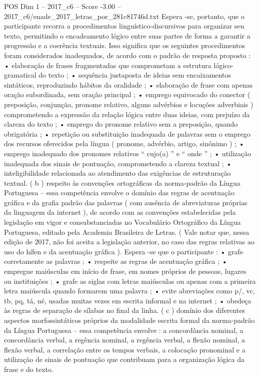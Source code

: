 \begin{textsample}{POS Dim 1 – 2017\_c6 – Score -3.00 – 2017\_c6/enade\_2017\_letras\_por\_281c81746d.txt}
Espera -se, portanto, que o participante recorra a procedimentos linguístico-discursivos para organizar seu texto, permitindo o encadeamento lógico entre suas partes de forma a garantir a progressão e a coerência textuais.
Isso significa que os seguintes procedimentos foram considerados inadequados, de acordo com o padrão de resposta proposto : • elaboração de frases fragmentadas que comprometam a estrutura lógico-gramatical do texto ; • sequência justaposta de ideias sem encaixamentos sintáticos, reproduzindo hábitos da oralidade ; • elaboração de frase com apenas oração subordinada, sem oração principal ; • emprego equivocado do conector ( preposição, conjunção, pronome relativo, alguns advérbios e locuções adverbiais ) comprometendo a expressão da relação lógica entre duas ideias, com prejuízo da clareza do texto ; • emprego do pronome relativo sem a preposição, quando obrigatória ; • repetição ou substituição inadequada de palavras sem o emprego dos recursos oferecidos pela língua ( pronome, advérbio, artigo, sinônimo ) ; • emprego inadequado dos pronomes relativos “ cujo(a) ” e “ onde ” ; • utilização inadequada dos sinais de pontuação, comprometendo a clareza textual ; • inteligibilidade relacionada ao atendimento das exigências de estruturação textual. ( b ) respeito às convenções ortográficas da norma-padrão da Língua Portuguesa – essa competência envolve o domínio das regras de acentuação gráfica e da grafia padrão das palavras ( com ausência de abreviaturas próprias da linguagem da internet ), de acordo com as convenções estabelecidas pela legislação em vigor e consubstanciadas no Vocabulário Ortográfico da Língua Portuguesa, editado pela Academia Brasileira de Letras. ( Vale notar que, nessa edição de 2017, não foi aceita a legislação anterior, no caso das regras relativas ao uso do hífen e da acentuação gráfica ).
Espera -se que o participante : • grafe corretamente as palavras ; • respeite as regras de acentuação gráfica ; • empregue maiúsculas em início de frase, em nomes próprios de pessoas, lugares ou instituições ; • grafe as siglas com letras maiúsculas ou apenas com a primeira letra maiúscula quando formarem uma palavra ; • evite abreviações como p/, vc, tb, pq, tá, né, usadas muitas vezes em escrita informal e na internet ; • obedeça às regras de separação de sílabas no final da linha. ( c ) domínio dos diferentes aspectos morfossintáticos próprios da modalidade escrita formal da norma-padrão da Língua Portuguesa – essa competência envolve : a concordância nominal, a concordância verbal, a regência nominal, a regência verbal, a flexão nominal, a flexão verbal, a correlação entre os tempos verbais, a colocação pronominal e a utilização de sinais de pontuação que contribuam para a organização lógica da frase e do texto.

\end{textsample}
